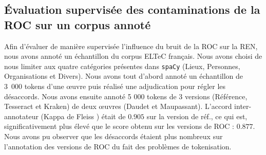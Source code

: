 


%    
%



\subsection{\'Evaluation supervisée des contaminations de la ROC sur un corpus annoté}
\label{subsec:eval_supervis_OCR-IMPACT-NER}
Afin d'évaluer de manière supervisée l'influence du bruit de la ROC sur la REN, nous avons annoté un échantillon du corpus ELTeC français.
 Nous avons choisi de nous limiter aux quatre catégories présentes dans \texttt{spaCy} (Lieux, Personnes, Organisations et Divers).
  Nous avons tout d'abord annoté un échantillon de 3~000 tokens d'une œuvre  puis réalisé une adjudication pour régler les désaccords. 
  Nous avons ensuite annoté 5 000 tokens de 3 versions (Référence, Tesseract et Kraken) de deux œuvres (Daudet et Maupassant). %
L'accord inter-annotateur (Kappa de  Fleiss \cite{fleiss2013statistical}) était de $0.905$ sur la version de réf., ce qui est, significativement plus élevé que le score obtenu sur les versions de ROC : $0.877$.
 Nous avons pu observer que les désaccords étaient plus nombreux sur l'annotation des versions de ROC du fait des problèmes de tokenisation.

